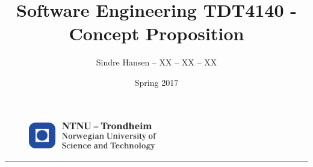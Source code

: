 \documentclass{article}
\title{Software Engineering TDT4140 - Concept Proposition}
\author{Sindre Hansen -- XX -- XX -- XX}
\date{Spring 2017}
\begin{document}
\begin{figure}
  \centering
  \includegraphics[width=0.5\textwidth]{images/logontnu_eng}
\end{figure}
\maketitle
\rule{\linewidth}{0.5mm}
\end{document}
